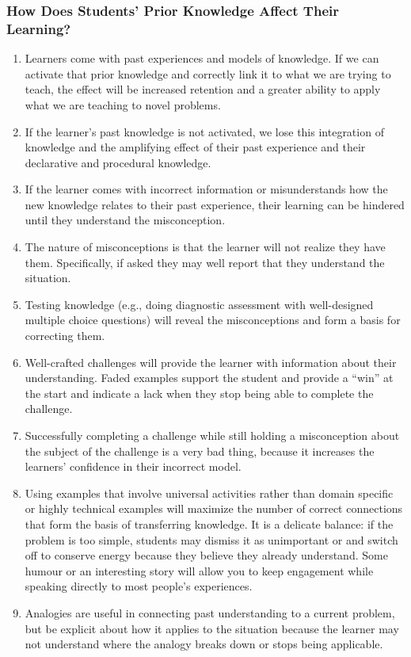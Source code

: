 \subsubsection{How Does Students' Prior Knowledge Affect Their
Learning?}\label{how-does-students-prior-knowledge-affect-their-learning}

\begin{enumerate}
\item
  Learners come with past experiences and models of knowledge. If we can
  activate that prior knowledge and correctly link it to what we are
  trying to teach, the effect will be increased retention and a greater
  ability to apply what we are teaching to novel problems.
\item
  If the learner's past knowledge is not activated, we lose this
  integration of knowledge and the amplifying effect of their past
  experience and their declarative and procedural knowledge.
\item
  If the learner comes with incorrect information or misunderstands how
  the new knowledge relates to their past experience, their learning can
  be hindered until they understand the misconception.
\item
  The nature of misconceptions is that the learner will not realize they
  have them. Specifically, if asked they may well report that they
  understand the situation.
\item
  Testing knowledge (e.g., doing diagnostic assessment with
  well-designed multiple choice questions) will reveal the
  misconceptions and form a basis for correcting them.
\item
  Well-crafted challenges will provide the learner with information
  about their understanding. Faded examples support the student and
  provide a ``win'' at the start and indicate a lack when they stop
  being able to complete the challenge.
\item
  Successfully completing a challenge while still holding a
  misconception about the subject of the challenge is a very bad thing,
  because it increases the learners' confidence in their incorrect
  model.
\item
  Using examples that involve universal activities rather than domain
  specific or highly technical examples will maximize the number of
  correct connections that form the basis of transferring knowledge. It
  is a delicate balance: if the problem is too simple, students may
  dismiss it as unimportant or and switch off to conserve energy because
  they believe they already understand. Some humour or an interesting
  story will allow you to keep engagement while speaking directly to
  most people's experiences.
\item
  Analogies are useful in connecting past understanding to a current
  problem, but be explicit about how it applies to the situation because
  the learner may not understand where the analogy breaks down or stops
  being applicable.
\end{enumerate}

